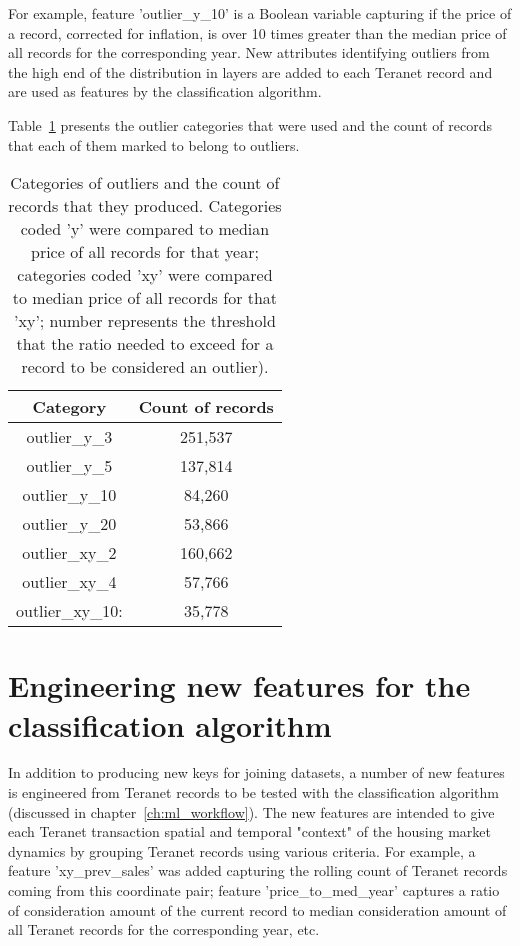 For example, feature 'outlier\_y\_10' is a Boolean variable capturing if the price of a record, corrected for inflation, is over 10 times greater than the median price of all records for the corresponding year.
New attributes identifying outliers from the high end of the distribution in layers are added to each Teranet record and are used as features by the classification algorithm.

\vspace{5mm}

Table~\ref{tab:outliers} presents the outlier categories that were used and the count of records that each of them marked to belong to outliers.

\begin{table}[h!]
    \centering
    \begin{tabular}{|| c | c ||}
        \hline
        Category & Count of records \\
        \hline
        \hline
        outlier\_y\_3 & 251,537 \\
        \hline
        outlier\_y\_5 & 137,814 \\
        \hline
        outlier\_y\_10 & 84,260 \\
        \hline
        outlier\_y\_20 & 53,866 \\
        \hline
        outlier\_xy\_2 & 160,662 \\
        \hline
        outlier\_xy\_4 & 57,766 \\
        \hline
        outlier\_xy\_10: & 35,778 \\
        \hline
    \end{tabular}
    \caption{Categories of outliers and the count of records that they produced.
    Categories coded 'y' were compared to median price of all records for that year;
    categories coded 'xy' were compared to median price of all records for that 'xy';
    number represents the threshold that the ratio needed to exceed for a record to be considered an outlier).}
    \label{tab:outliers}

\end{table}

\section{Engineering new features for the classification algorithm} \label{sec:feature_engineering}

In addition to producing new keys for joining datasets, a number of new features is engineered from Teranet records to be tested with the classification algorithm (discussed in chapter~\ref{ch:ml_workflow}).
The new features are intended to give each Teranet transaction spatial and temporal "context" of the housing market dynamics by grouping Teranet records using various criteria.
For example, a feature 'xy\_prev\_sales' was added capturing the rolling count of Teranet records coming from this coordinate pair;
feature 'price\_to\_med\_year' captures a ratio of consideration amount of the current record to median consideration amount of all Teranet records for the corresponding year, etc.

